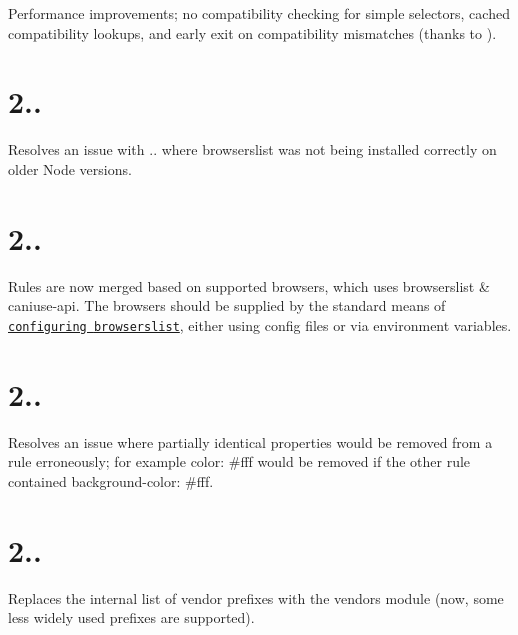 
\begin{DoxyItemize}
\item Performance improvements; no compatibility checking for simple selectors, cached compatibility lookups, and early exit on compatibility mismatches (thanks to ).
\end{DoxyItemize}

\section*{2..}


\begin{DoxyItemize}
\item Resolves an issue with {..} where {\ttfamily browserslist} was not being installed correctly on older Node versions.
\end{DoxyItemize}

\section*{2..}


\begin{DoxyItemize}
\item Rules are now merged based on supported browsers, which uses {\ttfamily browserslist} \& {\ttfamily caniuse-\/api}. The browsers should be supplied by the standard means of \href{https://github.com/ai/browserslist#config-file}{\tt configuring {\ttfamily browserslist}}, either using config files or via environment variables.
\end{DoxyItemize}

\section*{2..}


\begin{DoxyItemize}
\item Resolves an issue where partially identical properties would be removed from a rule erroneously; for example {\ttfamily color\+: \#fff} would be removed if the other rule contained {\ttfamily background-\/color\+: \#fff}.
\end{DoxyItemize}

\section*{2..}


\begin{DoxyItemize}
\item Replaces the internal list of vendor prefixes with the {\ttfamily vendors} module (now, some less widely used prefixes are supported).
\end{DoxyItemize}

